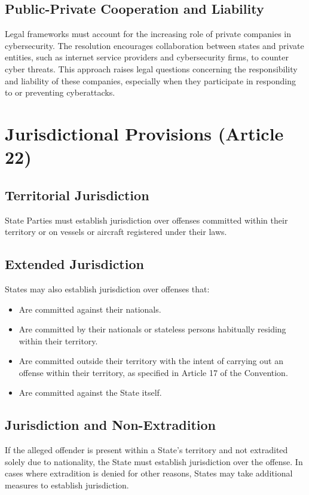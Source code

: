\subsection{Public-Private Cooperation and Liability}
Legal frameworks must account for the increasing role of private companies in cybersecurity. The resolution encourages collaboration between states and private entities, such as internet service providers and cybersecurity firms, to counter cyber threats. This approach raises legal questions concerning the responsibility and liability of these companies, especially when they participate in responding to or preventing cyberattacks.

\section{Jurisdictional Provisions (Article 22)}

\subsection{Territorial Jurisdiction}
State Parties must establish jurisdiction over offenses committed within their territory or on vessels or aircraft registered under their laws.

\subsection{Extended Jurisdiction}
States may also establish jurisdiction over offenses that:
\begin{itemize}
  \item Are committed against their nationals.
  \item Are committed by their nationals or stateless persons
    habitually residing within their territory.
  \item Are committed outside their territory with the intent of
    carrying out an offense within their territory, as specified in
    Article 17 of the Convention.
  \item Are committed against the State itself.
\end{itemize}

\subsection{Jurisdiction and Non-Extradition}
If the alleged offender is present within a State's territory and not extradited solely due to nationality, the State must establish jurisdiction over the offense. In cases where extradition is denied for other reasons, States may take additional measures to establish jurisdiction.

